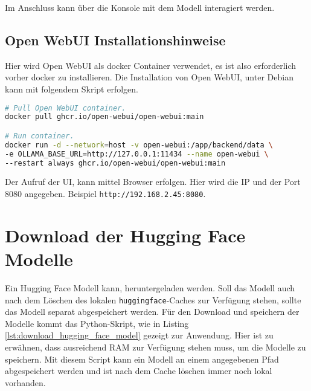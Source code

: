 Im Anschluss kann über die Konsole mit dem Modell interagiert werden.



\subsection{Open WebUI Installationshinweise}\label{sec:open_webui}
Hier wird Open WebUI als docker Container verwendet, es ist also erforderlich vorher docker zu installieren. Die Installation von Open WebUI, unter Debian kann mit folgendem Skript erfolgen. 

\begin{lstlisting}[language=bash,caption={Open WebUI installieren}]
# Pull Open WebUI container.
docker pull ghcr.io/open-webui/open-webui:main

# Run container.
docker run -d --network=host -v open-webui:/app/backend/data \
-e OLLAMA_BASE_URL=http://127.0.0.1:11434 --name open-webui \
--restart always ghcr.io/open-webui/open-webui:main
\end{lstlisting}

Der Aufruf der UI, kann mittel Browser erfolgen. Hier wird die IP und der Port 8080 angegeben. Beispiel \texttt{http://192.168.2.45:8080}.


\newpage
\section{Download der Hugging Face Modelle}\label{sec:hugging_face_models}
Ein Hugging Face Modell kann, heruntergeladen werden. Soll das Modell auch nach dem Löschen des lokalen \texttt{huggingface}-Caches zur Verfügung stehen, sollte das Modell separat abgespeichert werden. Für den Download und speichern der Modelle kommt das Python-Skript, wie in Listing \ref{lst:download_hugging_face_model} gezeigt zur Anwendung. Hier ist zu erwähnen, dass ausreichend RAM zur Verfügung stehen muss, um die Modelle zu speichern. Mit diesem Script kann ein Modell an einem angegebenen Pfad abgespeichert werden und ist nach dem Cache löschen immer noch lokal vorhanden.



